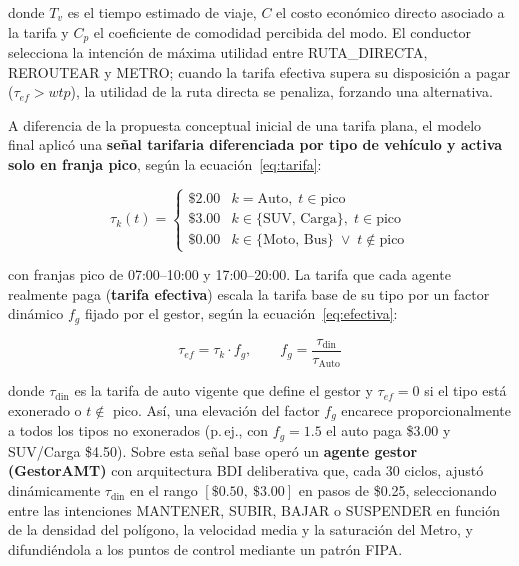 \documentclass[twocolumn,10pt]{article}
\begin{document}
\noindent donde $T_v$ es el tiempo estimado de viaje, $C$ el costo econ\'omico directo
asociado a la tarifa y $C_p$ el coeficiente de comodidad percibida del modo. El conductor
selecciona la intenci\'on de m\'axima utilidad entre RUTA\_DIRECTA, REROUTEAR y METRO;
cuando la tarifa efectiva supera su disposici\'on a pagar ($\tau_{ef} > wtp$), la utilidad
de la ruta directa se penaliza, forzando una alternativa.

A diferencia de la propuesta conceptual inicial de una tarifa plana, el modelo final
aplic\'o una \textbf{se\~nal tarifaria diferenciada por tipo de veh\'iculo y activa solo en
franja pico}, seg\'un la ecuaci\'on~\eqref{eq:tarifa}:

\begin{equation}
\tau_k(t)=
\begin{cases}
\$2.00 & k=\text{Auto},\; t\in\text{pico}\\[2pt]
\$3.00 & k\in\{\text{SUV, Carga}\},\; t\in\text{pico}\\[2pt]
\$0.00 & k\in\{\text{Moto, Bus}\}\;\lor\; t\notin\text{pico}
\end{cases}
\label{eq:tarifa}
\end{equation}

\noindent con franjas pico de 07:00--10:00 y 17:00--20:00. La tarifa que cada agente
realmente paga (\textbf{tarifa efectiva}) escala la tarifa base de su tipo por un factor
din\'amico $f_g$ fijado por el gestor, seg\'un la ecuaci\'on~\eqref{eq:efectiva}:

\begin{equation}
\tau_{ef}=\tau_k\cdot f_g,\qquad f_g=\frac{\tau_{\text{din}}}{\tau_{\text{Auto}}}
\label{eq:efectiva}
\end{equation}

\noindent donde $\tau_{\text{din}}$ es la tarifa de auto vigente que define el gestor y
$\tau_{ef}=0$ si el tipo est\'a exonerado o $t\notin$ pico. As\'i, una elevaci\'on del
factor $f_g$ encarece proporcionalmente a todos los tipos no exonerados (p.\,ej., con
$f_g=1.5$ el auto paga \$3.00 y SUV/Carga \$4.50). Sobre esta se\~nal base oper\'o un
\textbf{agente gestor (GestorAMT)} con arquitectura BDI deliberativa que, cada 30 ciclos,
ajust\'o din\'amicamente $\tau_{\text{din}}$ en el rango $[\$0.50,\ \$3.00]$ en pasos de
\$0.25, seleccionando entre las intenciones MANTENER, SUBIR, BAJAR o SUSPENDER en
funci\'on de la densidad del pol\'igono, la velocidad media y la saturaci\'on del Metro, y
difundi\'endola a los puntos de control mediante un patr\'on FIPA.
\end{document}
